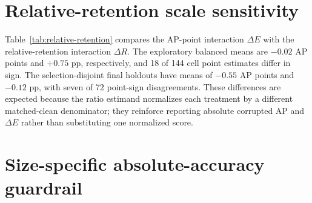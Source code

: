 \documentclass[10pt]{article}
\newcommand{\DeltaE}{\Delta E}
\newcommand{\DeltaR}{\Delta R}
\begin{document}
\begin{table}[htbp]
\centering
\caption{Factor-level heterogeneity in the exploratory direct ledger.}
\label{tab:factor-summary}
\scriptsize
\resizebox{\textwidth}{!}{}
\end{table}

\FloatBarrier

\section{Relative-retention scale sensitivity}

Table~\ref{tab:relative-retention} compares the AP-point interaction $\DeltaE$
with the relative-retention interaction $\DeltaR$. The exploratory balanced
means are $-0.02$ AP points and $+0.75$ pp, respectively, and 18 of 144 cell
point estimates differ in sign. The selection-disjoint final holdouts have means of $-0.55$
AP points and $-0.12$ pp, with seven of 72 point-sign disagreements. These
differences are expected because the ratio estimand normalizes each treatment
by a different matched-clean denominator; they reinforce reporting absolute
corrupted AP and $\DeltaE$ rather than substituting one normalized score.

\begin{table}[htbp]
\centering
\caption{Relative-retention sensitivity. Mean $\DeltaE$ is in AP points and
mean $\DeltaR$ is in percentage points (pp). Sign differences compare finite
cell point estimates, not interval decisions.}
\label{tab:relative-retention}
\small
\resizebox{0.92\textwidth}{!}{}
\end{table}

\begin{table}[htbp]
\centering
\caption{All 18 exploratory cells for which the point estimates of $\DeltaE$
and $\DeltaR$ have different signs. The seven holdout disagreements are
summarized in Table~\ref{tab:relative-retention}.}
\label{tab:relative-retention-disagreements}
\scriptsize
\resizebox{\textwidth}{!}{}
\end{table}

\FloatBarrier

\section{Size-specific absolute-accuracy guardrail}
\end{document}
